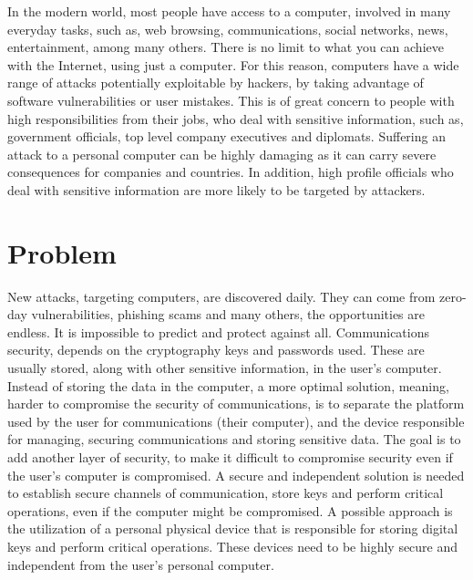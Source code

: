 \cleardoublepage
\label{chap:intro}

In the modern world, most people have access to a computer, involved in many everyday tasks, such as, web browsing, communications, social networks, news, entertainment, among many others.
There is no limit to what you can achieve with the Internet, using just a computer.
For this reason, computers have a wide range of attacks potentially exploitable by hackers, by taking advantage of software vulnerabilities or user mistakes.
This is of great concern to people with high responsibilities from their jobs, who deal with sensitive information, such as, government officials, top level company executives and diplomats.
Suffering an attack to a personal computer can be highly damaging as it can carry severe consequences for companies and countries.
In addition, high profile officials who deal with sensitive information are more likely to be targeted by attackers.

\section{Problem} \label{chap:intro:problem}

New attacks, targeting computers, are discovered daily.
They can come from zero-day vulnerabilities, phishing scams and many others, the opportunities are endless. It is impossible to predict and protect against all.
Communications security, depends on the cryptography keys and passwords used. These are usually stored, along with other sensitive information, in the user's computer.
Instead of storing the data in the computer, a more optimal solution, meaning, harder to compromise the security of communications, is to separate the platform used by the user for communications (their computer), and the device responsible for managing, securing communications and storing sensitive data.
The goal is to add another layer of security, to make it difficult to compromise security even if the user's computer is compromised.
A secure and independent solution is needed to establish secure channels of communication, store keys and perform critical operations, even if the computer might be compromised.
A possible approach is the utilization of a personal physical device that is responsible for storing digital keys and perform critical operations.
These devices need to be highly secure and independent from the user's personal computer.

